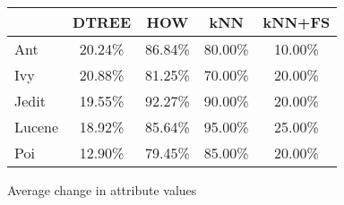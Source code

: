 \begin{figure}[!t]
\centering
{\small
\begin{tabular}{lcccc}
  \hline
  \rowcolor{lightgray}
       & DTREE & HOW   & kNN   & kNN+FS \\\hline
Ant    & 20.24\% & 86.84\% & 80.00\% & 10.00\%  \\
Ivy    & 20.88\% & 81.25\% & 70.00\% & 20.00\%  \\
Jedit  & 19.55\% & 92.27\% & 90.00\% & 20.00\%  \\
Lucene & 18.92\% & 85.64\% & 95.00\% & 25.00\%  \\
Poi    & 12.90\% & 79.45\% & 85.00\% & 20.00\%   \\\hline
\end{tabular}}
\noindent
\caption{Average change in attribute values}\label{fig:types}
\end{figure}